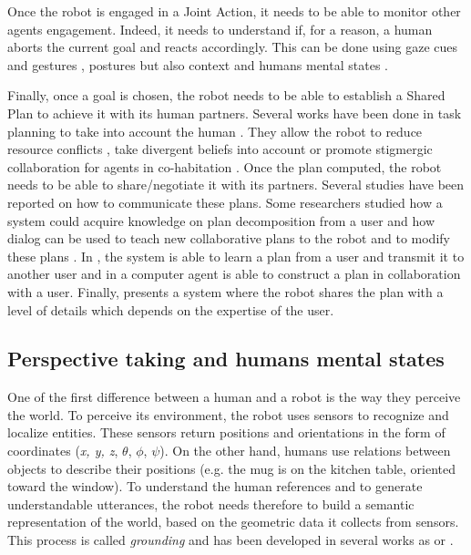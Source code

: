 \documentclass[english,a4paper,11pt,twoside]{StyleThese}
\begin{document}
Once the robot is engaged in a Joint Action, it needs to be able to monitor other agents engagement. Indeed, it needs to understand if, for a reason, a human aborts the current goal and reacts accordingly. This can be done using gaze cues and gestures \cite{rich2010recognizing}, postures \cite{sanghvi2011automatic} but also context and humans mental states \cite{salam2015multi}.

Finally, once a goal is chosen, the robot needs to be able to establish a Shared Plan to achieve it with its human partners. Several works have been done in task planning to take into account the human \cite{cirillo2010human,Lallement2014hatp}. They allow the robot to reduce resource conflicts \cite{chakraborti2016planning}, take divergent beliefs into account \cite{guitton2012belief,talamadupula2014coordination} or promote stigmergic collaboration
for agents in co-habitation \cite{chakraborti2015planning}. 
Once the plan computed, the robot needs to be able to share/negotiate it with its partners. Several studies have been reported on how to communicate these plans. Some researchers studied how a system could acquire knowledge on plan decomposition from a user \cite{Mohseni2015} and how dialog can be used to teach new collaborative plans to the robot and to modify these plans \cite{petit2013coordinating}. In \cite{sorce2015proof}, the system is able to learn a plan from a user and transmit it to another user and in \cite{allen2002human} a computer agent is able to construct a plan in collaboration with a user. Finally, \cite{milliez2016using} presents a system where the robot shares the plan with a level of details which depends on the expertise of the user.

\subsection{Perspective taking and humans mental states}

\label{subsec:perspective_taking}

One of the first difference between a human and a robot is the way they perceive the world. To perceive its environment, the robot uses sensors to recognize and localize entities. These sensors return positions and orientations in the form of coordinates (\textit{x, y, z}, $\theta$, $\phi$, $\psi$). On the other hand, humans use relations between objects to describe their positions (e.g. the mug is on the kitchen table, oriented toward the window). To understand the human references and to
generate understandable utterances, the robot needs therefore
to build a semantic representation of the world, based on the
geometric data it collects from sensors. This process is called \textit{grounding} and has been developed in several works as \cite{mavridis2005grounded} or \cite{lemaignan2012grounding}.
\end{document}
